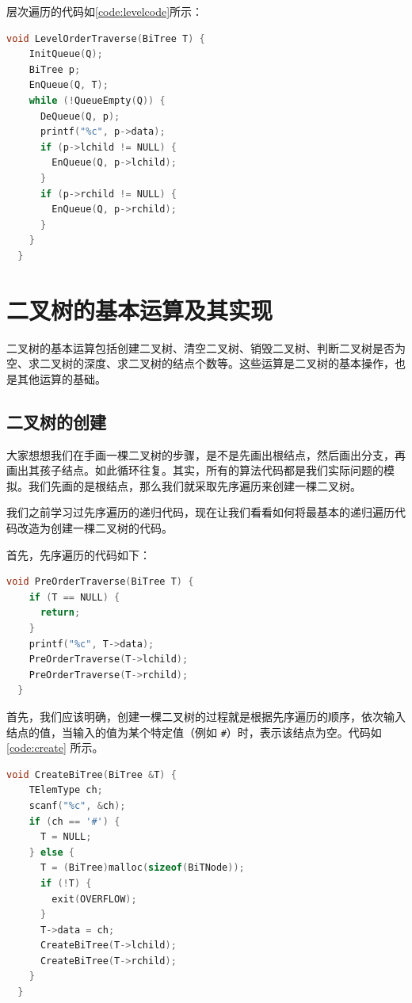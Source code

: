\documentclass[lang=cn,newtx,10pt,scheme=chinese]{../elegantbook}
\begin{document}
层次遍历的代码如\ref{code:levelcode}所示：

\begin{lstlisting}[language=C++, caption={层次遍历}, label={code:levelcode}]
  void LevelOrderTraverse(BiTree T) {
    InitQueue(Q);
    BiTree p;
    EnQueue(Q, T);
    while (!QueueEmpty(Q)) {
      DeQueue(Q, p);
      printf("%c", p->data);
      if (p->lchild != NULL) {
        EnQueue(Q, p->lchild);
      }
      if (p->rchild != NULL) {
        EnQueue(Q, p->rchild);
      }
    }
  }
\end{lstlisting}



\section{二叉树的基本运算及其实现}
二叉树的基本运算包括创建二叉树、清空二叉树、销毁二叉树、判断二叉树是否为空、求二叉树的深度、求二叉树的结点个数等。这些运算是二叉树的基本操作，也是其他运算的基础。
\subsection{二叉树的创建}

大家想想我们在手画一棵二叉树的步骤，是不是先画出根结点，然后画出分支，再画出其孩子结点。如此循环往复。其实，所有的算法代码都是我们实际问题的模拟。我们先画的是根结点，那么我们就采取先序遍历来创建一棵二叉树。

我们之前学习过先序遍历的递归代码，现在让我们看看如何将最基本的递归遍历代码改造为创建一棵二叉树的代码。

首先，先序遍历的代码如下：

\begin{lstlisting}[language=C++, caption={先序遍历}]
  void PreOrderTraverse(BiTree T) {
    if (T == NULL) {
      return;
    }
    printf("%c", T->data);
    PreOrderTraverse(T->lchild);
    PreOrderTraverse(T->rchild);
  }
\end{lstlisting}

首先，我们应该明确，创建一棵二叉树的过程就是根据先序遍历的顺序，依次输入结点的值，当输入的值为某个特定值（例如 \texttt{\#}）时，表示该结点为空。代码如 \ref{code:create} 所示。

\begin{lstlisting}[language=C++, caption={创建二叉树}, label={code:create}]
  void CreateBiTree(BiTree &T) {
    TElemType ch;
    scanf("%c", &ch);
    if (ch == '#') {
      T = NULL;
    } else {
      T = (BiTree)malloc(sizeof(BiTNode));
      if (!T) {
        exit(OVERFLOW);
      }
      T->data = ch;
      CreateBiTree(T->lchild);
      CreateBiTree(T->rchild);
    }
  }
\end{lstlisting}
\end{document}
